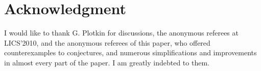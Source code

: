 \documentclass{LMCS}
\begin{document}
\section*{Acknowledgment}

I would like to thank G. Plotkin for discussions, the anonymous
referees at LICS'2010, and the anonymous referees of this paper, who
offered counterexamples to conjectures, and numerous simplifications
and improvements in almost every part of the paper.  I am greatly
indebted to them.







\end{document}
